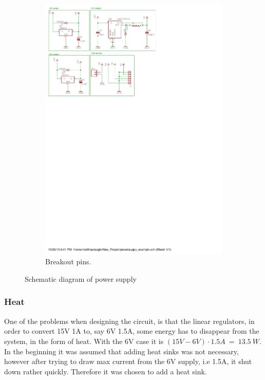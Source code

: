 \begin{figure}[H]
\begin{subfigure}{0.4\linewidth}
\includegraphics[scale=0.8,trim={5.3cm 18.5cm 10.4cm 6.0cm},clip]{img/powersupply.pdf}
\caption{Breakout pins.}
\label{fig::sch_power_pins}
\end{subfigure}
\caption{Schematic diagram of power supply}
\label{fig::sch_power}
\end{figure}


\subsubsection{Heat}
One of the problems when designing the circuit, is that the linear regulators, in order to convert 15V 1A to, say 6V 1.5A, some energy has to disappear from the system, in the form of heat. With the 6V case it is $(15V - 6V)\cdot 1.5A\ =\ 13.5\ W$. In the beginning it was assumed that adding heat sinks was not necessary, however after trying to draw max current from the 6V supply, i.e 1.5A, it shut down rather quickly. Therefore it was chosen to add a heat sink. 

